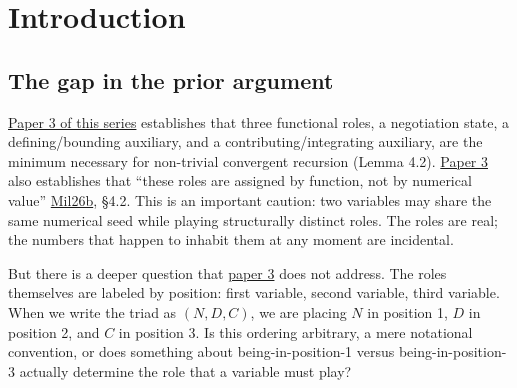 \documentclass[12pt]{article}
\begin{document}
\begin{abstract}
We do not claim a formal theorem in the strongest sense: we cannot rule
out that a future algebraic framework reorders or augments the mapping.
What we claim is more modest and more defensible: within the class of
minimal recursive systems satisfying the conditions of Lemma 4.2 of
\href{https://github.com/baardev/truevalue/blob/main/docnav/Research/papers/3_minimal-recursive-triadic-framework/3_minimal-recursive-triadic-framework.pdf}{paper
3}, the mapping from cardinality to role is the unique assignment
consistent with the structural properties of 1, 2, and 3 as they appear
across the five domains examined. Resolving this into a strict theorem
is identified as an open problem.
\end{abstract}

\section{Introduction}\label{introduction}

\subsection{The gap in the prior argument}\label{the-gap-in-the-prior-argument}

\href{https://github.com/baardev/truevalue/blob/main/docnav/Research/papers/3_minimal-recursive-triadic-framework/3_minimal-recursive-triadic-framework.pdf}{Paper
3 of this series} establishes that three functional roles, a negotiation
state, a defining/bounding auxiliary, and a contributing/integrating
auxiliary, are the minimum necessary for non-trivial convergent
recursion (Lemma 4.2).
\href{https://github.com/baardev/truevalue/blob/main/docnav/Research/papers/3_minimal-recursive-triadic-framework/3_minimal-recursive-triadic-framework.pdf}{Paper
3} also establishes that ``these roles are assigned by function, not by
numerical value''
\href{https://github.com/baardev/truevalue/blob/main/docnav/Research/papers/3_minimal-recursive-triadic-framework/3_minimal-recursive-triadic-framework.pdf}{Mil26b},
§4.2. This is an important caution: two variables may share the same
numerical seed while playing structurally distinct roles. The roles are
real; the numbers that happen to inhabit them at any moment are
incidental.

But there is a deeper question that
\href{https://github.com/baardev/truevalue/blob/main/docnav/Research/papers/3_minimal-recursive-triadic-framework/3_minimal-recursive-triadic-framework.pdf}{paper
3} does not address. The roles themselves are labeled by position: first
variable, second variable, third variable. When we write the triad as
\((N, D, C)\), we are placing \(N\) in position 1, \(D\) in position 2,
and \(C\) in position 3. Is this ordering arbitrary, a mere notational
convention, or does something about being-in-position-1 versus
being-in-position-3 actually determine the role that a variable must
play?
\end{document}
